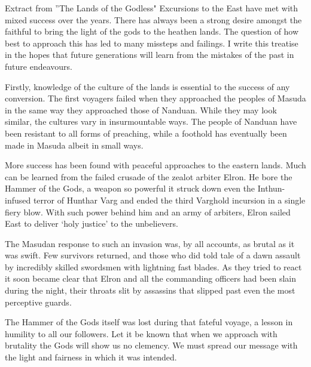 \begin{DndComment}{Extract from ''The Lands of the Godless"}
Excursions to the East have met with mixed success over the years. There has always been a strong desire amongst the faithful to bring the light of the gods to the heathen lands. The question of how best to approach this has led to many missteps and failings. I write this treatise in the hopes that future generations will learn from the mistakes of the past in future endeavours.

Firstly, knowledge of the culture of the lands is essential to the success of any conversion. The first voyagers failed when they approached the peoples of Masuda in the same way they approached those of Nanduan. While they may look similar, the cultures vary in insurmountable ways. The people of Nanduan have been resistant to all forms of preaching, while a foothold has eventually been made in Masuda albeit in small ways.

More success has been found with peaceful approaches to the eastern lands. Much can be learned from the failed crusade of the zealot arbiter Elron. He bore the Hammer of the Gods, a weapon so powerful it struck down even the Inthun-infused terror of Hunthar Varg and ended the third Varghold incursion in a single fiery blow. With such power behind him and an army of arbiters, Elron sailed East to deliver ‘holy justice’ to the unbelievers.

The Masudan response to such an invasion was, by all accounts, as brutal as it was swift. Few survivors returned, and those who did told tale of a dawn assault by incredibly skilled swordsmen with lightning fast blades. As they tried to react it soon became clear that Elron and all the commanding officers had been slain during the night, their throats slit by assassins that slipped past even the most perceptive guards.

The Hammer of the Gods itself was lost during that fateful voyage, a lesson in humility to all our followers. Let it be known that when we approach with brutality the Gods will show us no clemency. We must spread our message with the light and fairness in which it was intended.
\end{DndComment}

\smallskip







\clearpage